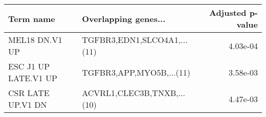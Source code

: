 \begin{tabular}{llr}
\toprule
           Term name &        Overlapping genes... &  Adjusted p-value \\
\midrule
      MEL18 DN.V1 UP & TGFBR3,EDN1,SLCO4A1,...(11) &          4.03e-04 \\
ESC J1 UP LATE.V1 UP &    TGFBR3,APP,MYO5B,...(11) &          3.58e-03 \\
   CSR LATE UP.V1 DN &  ACVRL1,CLEC3B,TNXB,...(10) &          4.47e-03 \\
\bottomrule
\end{tabular}
